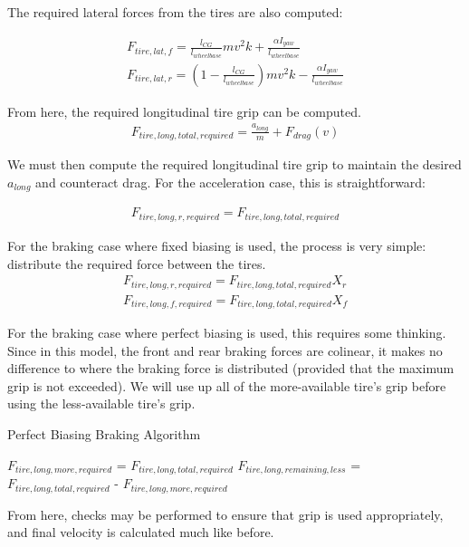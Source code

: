 \documentclass{article}
\begin{document}
The required lateral forces from the tires are also computed:

\begin{align}
	F_{tire,lat,f} = \frac{l_{CG}}{l_{wheelbase}} m v^2 k + \frac{\alpha I_{yaw}}{l_{wheelbase}}  \\ 
	F_{tire,lat,r} = (1-\frac{l_{CG}}{l_{wheelbase}}) m v^2 k - \frac{\alpha I_{yaw}}{l_{wheelbase}}
\end{align}

From here, the required longitudinal tire grip can be computed.
\begin{align}
	F_{tire,long,total,required} = \frac{a_{long}}{m} + F_{drag}(v)
\end{align}

We must then compute the required longitudinal tire grip to maintain the desired $a_{long}$ and counteract drag. For the acceleration case, this is straightforward:

\begin{align}
	F_{tire,long,r,required} = F_{tire,long,total,required}
\end{align}

For the braking case where fixed biasing is used, the process is very simple: distribute the required force between the tires.
\begin{align}
	F_{tire,long,r,required} = F_{tire,long,total,required} X_r \\
	F_{tire,long,f,required} = F_{tire,long,total,required} X_f
\end{align}

For the braking case where perfect biasing is used, this requires some thinking. Since in this model, the front and rear braking forces are colinear, it makes no difference to where the braking force is distributed (provided that the maximum grip is not exceeded). We will use up all of the more-available tire's grip before using the less-available tire's grip.

\begin{algorithm}[H]
\caption{Perfect Biasing Braking Algorithm}
\begin{algorithmic}[1]
	\State $F_{tire,long,more,required}$ = $F_{tire,long,total,required}$
	\State	$F_{tire,long,remaining,less}$ = $F_{tire,long,total,required}$ - $F_{tire,long,more,required}$
	\EndIf
\end{algorithmic}
\end{algorithm}

From here, checks may be performed to ensure that grip is used appropriately, and final velocity is calculated much like before.
\end{document}
